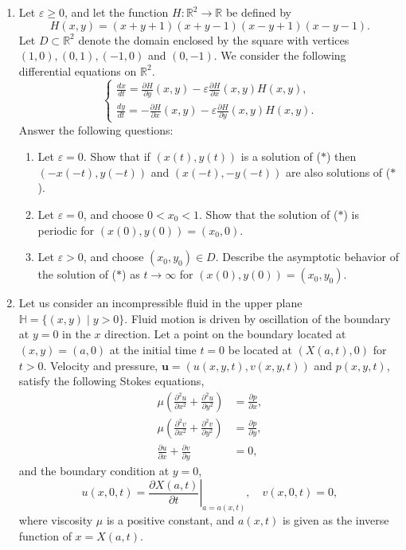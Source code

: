 \documentclass{article}
\begin{document}
\begin{enumerate}[label=\fbox{\arabic*}]
  \item %
        Let $\varepsilon \ge 0$, and let the function $H: \mathbb{R}^2 \to \mathbb{R}$ be defined by
        \[
          H(x, y) = (x+y+1)(x+y-1)(x-y+1)(x-y-1).
        \]
        Let $D \subset \mathbb{R}^2$ denote the domain enclosed by the square with vertices $(1,0), (0,1), (-1,0)$ and $(0,-1)$. We consider the following differential equations on $\mathbb{R}^2$.
        \begin{equation}
          \begin{cases} \frac{dx}{dt} = \frac{\partial H}{\partial y}(x, y) - \varepsilon \frac{\partial H}{\partial x}(x, y) H(x, y), \\ \frac{dy}{dt} = -\frac{\partial H}{\partial x}(x, y) - \varepsilon \frac{\partial H}{\partial y}(x, y) H(x, y). \end{cases} \tag{$*$}
        \end{equation}
        Answer the following questions:
        \begin{enumerate}[label=(\arabic*)]
          \item Let $\varepsilon = 0$. Show that if $(x(t), y(t))$ is a solution of ($*$) then $(-x(-t), y(-t))$ and $(x(-t), -y(-t))$ are also solutions of ($*$).
          \item Let $\varepsilon = 0$, and choose $0 < x_0 < 1$. Show that the solution of ($*$) is periodic for $(x(0), y(0)) = (x_0, 0)$.
          \item Let $\varepsilon > 0$, and choose $(x_0, y_0) \in D$. Describe the asymptotic behavior of the solution of ($*$) as $t \to \infty$ for $(x(0), y(0)) = (x_0, y_0)$.
        \end{enumerate}
  \item %
        Let us consider an incompressible fluid in the upper plane $\mathbb{H} = \{(x, y) \mid y > 0\}$. Fluid motion is driven by oscillation of the boundary at $y = 0$ in the $x$ direction. Let a point on the boundary located at $(x, y) = (a, 0)$ at the initial time $t = 0$ be located at $(X(a, t), 0)$ for $t > 0$. Velocity and pressure, $\bm{u} = (u(x, y, t), v(x, y, t))$ and $p(x, y, t)$, satisfy the following Stokes equations,
        \begin{align*}
          \mu \left( \frac{\partial^2 u}{\partial x^2} + \frac{\partial^2 u}{\partial y^2} \right) &= \frac{\partial p}{\partial x}, \\
          \mu \left( \frac{\partial^2 v}{\partial x^2} + \frac{\partial^2 v}{\partial y^2} \right) &= \frac{\partial p}{\partial y}, \\
          \frac{\partial u}{\partial x} + \frac{\partial v}{\partial y} &= 0,
        \end{align*}
        and the boundary condition at $y = 0$,
        \[
          u(x, 0, t) = \left. \frac{\partial X(a, t)}{\partial t} \right|_{a = a(x, t)}, \quad v(x, 0, t) = 0,
        \]
        where viscosity $\mu$ is a positive constant, and $a(x, t)$ is given as the inverse function of $x = X(a, t)$.
        

\end{enumerate}
\end{document}
